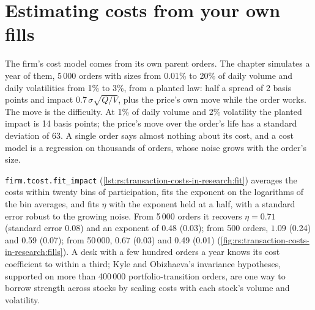 \section{Estimating costs from your own fills}

The firm's cost model comes from its own parent orders. The chapter simulates a year of them, 5\,000 orders with sizes from 0.01\% to 20\% of daily volume and
daily volatilities from 1\% to 3\%, from a planted law: half a spread of 2 basis points and impact $0.7\,\sigma\sqrt{Q/V}$, plus the price's own move while the order
works. The move is the difficulty. At 1\% of daily volume and 2\% volatility the planted impact is 14 basis points; the price's move over the order's life has a
standard deviation of 63. A single order says almost nothing about its cost, and a cost model is a regression on thousands of orders, whose noise grows with the
order's size.

\texttt{firm.tcost.fit\_impact} (\cref{lst:rs:transaction-costs-in-research:fit}) averages the costs within twenty bins of participation, fits the exponent on the
logarithms of the bin averages, and fits $\eta$ with the exponent held at a half, with a standard error robust to the growing noise. From 5\,000 orders it recovers
$\eta = 0.71$ (standard error 0.08) and an exponent of 0.48 (0.03); from 500 orders, $1.09$ (0.24) and 0.59 (0.07); from 50\,000, $0.67$ (0.03) and 0.49 (0.01)
(\cref{fig:rs:transaction-costs-in-research:fills}). A desk with a few hundred orders a year knows its cost coefficient to within a third; Kyle and Obizhaeva's
invariance hypotheses, supported on more than 400\,000 portfolio-transition orders, are one way to borrow strength across stocks by scaling costs with each stock's
volume and volatility.

\begin{omfigure}

\label{fig:rs:transaction-costs-in-research:fills}
\end{omfigure}

